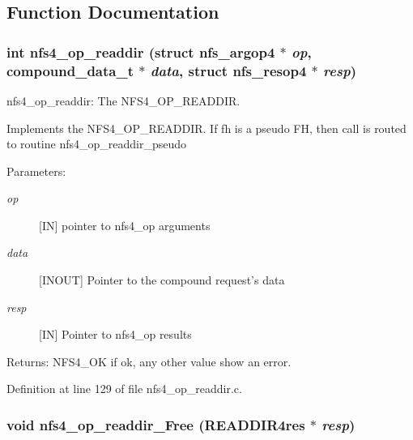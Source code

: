 \subsection{Function Documentation}
\subsubsection[{nfs4\_\-op\_\-readdir}]{\setlength{\rightskip}{0pt plus 5cm}int nfs4\_\-op\_\-readdir (struct nfs\_\-argop4 $\ast$ {\em op}, \/  compound\_\-data\_\-t $\ast$ {\em data}, \/  struct nfs\_\-resop4 $\ast$ {\em resp})}\label{nfs4__op__readdir_8c_6635db351f8362a123052e09739f8d29}


nfs4\_\-op\_\-readdir: The NFS4\_\-OP\_\-READDIR.

Implements the NFS4\_\-OP\_\-READDIR. If fh is a pseudo FH, then call is routed to routine nfs4\_\-op\_\-readdir\_\-pseudo

\begin{Desc}
\item[Parameters:]
\begin{description}
\item[{\em op}][IN] pointer to nfs4\_\-op arguments \item[{\em data}][INOUT] Pointer to the compound request's data \item[{\em resp}][IN] Pointer to nfs4\_\-op results\end{description}
\end{Desc}
\begin{Desc}
\item[Returns:]NFS4\_\-OK if ok, any other value show an error. \end{Desc}


Definition at line 129 of file nfs4\_\-op\_\-readdir.c.
\subsubsection[{nfs4\_\-op\_\-readdir\_\-Free}]{\setlength{\rightskip}{0pt plus 5cm}void nfs4\_\-op\_\-readdir\_\-Free (READDIR4res $\ast$ {\em resp})}\label{nfs4__op__readdir_8c_28bd74099667237874d6ec1103df378f}



